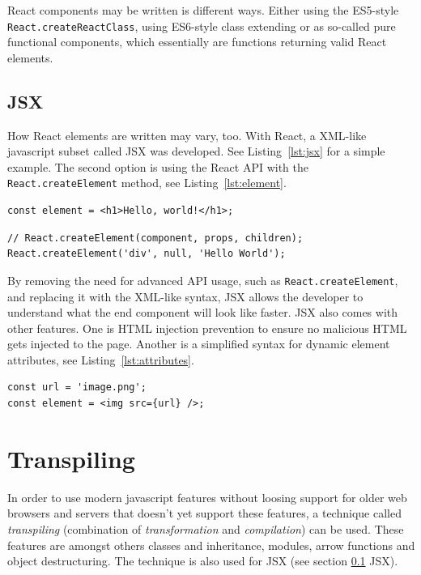 React components may be written is different ways. Either using the ES5-style \cite{es5} \texttt{React.createReactClass}, using ES6-style \cite{es6} class extending or as so-called pure functional components, which essentially are functions returning valid React elements.

\subsection{JSX}\label{sec:jsx}

How React elements are written may vary, too. With React, a XML-like javascript subset called JSX was developed. See Listing~\ref{lst:jsx} for a simple example. The second option is using the React API with the \texttt{React.createElement} method, see Listing~\ref{lst:element}.

\begin{lstlisting}[caption={Simple JSX example snippet},label=lst:jsx]
const element = <h1>Hello, world!</h1>;
\end{lstlisting}

\begin{lstlisting}[caption={Usage of React.createElement},label=lst:element]
// React.createElement(component, props, children);
React.createElement('div', null, 'Hello World');
\end{lstlisting}

By removing the need for advanced API usage, such as \texttt{React.createElement}, and replacing it with the XML-like syntax, JSX allows the developer to understand what the end component will look like faster. JSX also comes with other features. One is HTML injection prevention to ensure no malicious HTML gets injected to the page. Another is a simplified syntax for dynamic element attributes, see Listing~\ref{lst:attributes}.

\begin{lstlisting}[caption={Element attributes in JSX},label=lst:attributes]
const url = 'image.png';
const element = <img src={url} />;
\end{lstlisting}

\section{Transpiling}

In order to use modern javascript features without loosing support for older web browsers and servers that doesn't yet support these features, a technique called \emph{transpiling} (combination of \emph{transformation} and \emph{compilation}) can be used. \cite[p. 3-4]{youdontknowjs} These features are amongst others classes and inheritance, modules, arrow functions and object destructuring. The technique is also used for JSX (see section \ref{sec:jsx} JSX).

